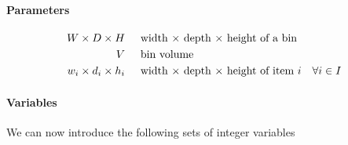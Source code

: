\paragraph*{Parameters}
\begin{align}
          W \times D \times H  \hspace{.5cm}& \text{width $\times$ depth $\times$ height of a bin} \notag \\
                            V  \hspace{.5cm}& \text{bin volume} \notag \\
    w_i \times d_i \times h_i  \hspace{.5cm}& \text{width $\times$ depth $\times$ height of item $i$} & \forall i \in I \label{par:item_dim}
\end{align}

\paragraph*{Variables} We can now introduce the following sets of integer variables
